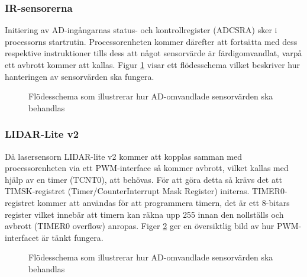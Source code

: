 \documentclass[11pt]{article}
\begin{document}
\begin{flushleft}
\subsubsection{IR-sensorerna}
Initiering av AD-ingångarnas status- och kontrollregister (ADCSRA) sker i processorns startrutin. Processorenheten kommer därefter att fortsätta med dess respektive instruktioner tills dess att något sensorvärde är färdigomvandlat, varpå ett avbrott kommer att kallas. Figur \ref{datormodul:Avbrott_ADC} visar ett flödesschema vilket beskriver hur hanteringen av sensorvärden ska fungera.


\begin{figure}[htbp]
\centering
\noindent\resizebox{.5\linewidth}{!}{
	}
	\caption{Flödesschema som illustrerar hur AD-omvandlade sensorvärden ska behandlas\label{datormodul:Avbrott_ADC}}	
\end{figure}


\FloatBarrier
\subsubsection{LIDAR-Lite v2}
Då lasersensorn LIDAR-lite v2 kommer att kopplas samman med processorenheten via ett PWM-interface så kommer avbrott, vilket kallas med hjälp av en timer (TCNT0), att behövas. För att göra detta så krävs det att TIMSK-registret (Timer/CounterInterrupt Mask Register) initeras. TIMER0-registret kommer att användas för att programmera timern, det är ett 8-bitars register vilket innebär att timern kan räkna upp 255 innan den nollställs och avbrott (TIMER0 overflow) anropas. Figer \ref{datormodul:Avbrott_PWM} ger en översiktlig bild av hur PWM-interfacet är tänkt fungera.
\begin{figure}[htbp]
\centering
\noindent\resizebox{.5\linewidth}{!}{
	}
	\caption{Flödesschema som illustrerar hur AD-omvandlade sensorvärden ska behandlas\label{datormodul:Avbrott_PWM}}	
\end{figure}
\pagebreak



\end{flushleft}
\end{document}
